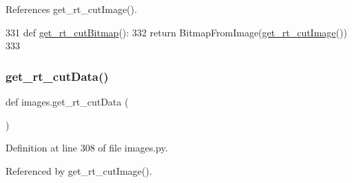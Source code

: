 References get\+\_\+rt\+\_\+cut\+Image().


\begin{DoxyCode}
331 \textcolor{keyword}{def }\hyperlink{namespaceimages_abf3deb680d420f30bc46ab3d8eb77dd9}{get\_rt\_cutBitmap}():
332     \textcolor{keywordflow}{return} BitmapFromImage(\hyperlink{namespaceimages_afb08afa7f129f5a1687116c72ff11b35}{get\_rt\_cutImage}())
333 
\end{DoxyCode}
\mbox{\label{namespaceimages_a88736560f7eb544aa69442ba704cffd6}} 
\subsubsection{\texorpdfstring{get\+\_\+rt\+\_\+cut\+Data()}{get\_rt\_cutData()}}
{\footnotesize\ttfamily def images.\+get\+\_\+rt\+\_\+cut\+Data (\begin{DoxyParamCaption}{ }\end{DoxyParamCaption})}



Definition at line 308 of file images.\+py.



Referenced by get\+\_\+rt\+\_\+cut\+Image().


